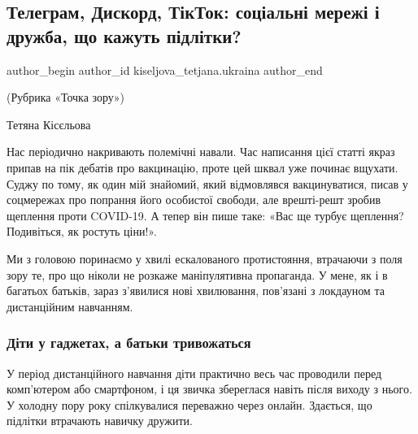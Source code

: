  
 
 
 
 
\subsection{Телеграм, Дискорд, ТікТок: соціальні мережі і дружба, що кажуть підлітки?}
\label{sec:24_12_2021.stz.news.ua.radiosvoboda.1.podrostki_tiktok_psihologia}


\ifcmt
 author_begin
   author_id kiseljova_tetjana.ukraina
 author_end
\fi

(Рубрика «Точка зору»)

Тетяна Кісєльова

Нас періодично накривають полемічні навали. Час написання цієї статті якраз
припав на пік дебатів про вакцинацію, проте цей шквал уже починає вщухати.
Суджу по тому, як один мій знайомий, який відмовлявся вакцинуватися, писав у
соцмережах про попрання його особистої свободи, але врешті-решт зробив щеплення
проти COVID-19. А тепер він пише таке: «Вас ще турбує щеплення? Подивіться, як
ростуть ціни!».

Ми з головою поринаємо у хвилі ескалованого протистояння, втрачаючи з поля зору
те, про що ніколи не розкаже маніпулятивна пропаганда. У мене, як і в багатьох
батьків, зараз з’явилися нові хвилювання, пов’язані з локдауном та дистанційним
навчанням.


\subsubsection{Діти у гаджетах, а батьки тривожаться}

У період дистанційного навчання діти практично весь час проводили перед
комп’ютером або смартфоном, і ця звичка збереглася навіть після виходу з нього.
У холодну пору року спілкувалися переважно через онлайн. Здається, що підлітки
втрачають навичку дружити.

